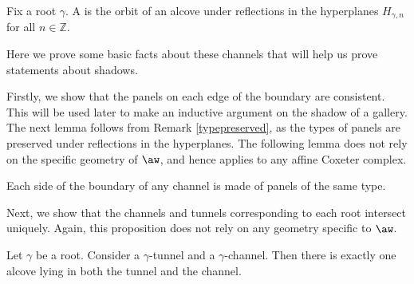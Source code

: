 \documentclass[11pt]{article}
\begin{document}
\begin{definition}
    Fix a root $\gamma$. A  is the orbit of an alcove under reflections in the hyperplanes $H_{\gamma,n}$ for all $n\in \mathbb{Z}$. 
\end{definition}


Here we prove some basic facts about these channels that will help us prove statements about shadows.

Firstly, we show that the panels on each edge of the boundary are consistent. This will be used later to make an inductive argument on the shadow of a gallery. The next lemma follows from Remark \ref{typepreserved}, as the types of panels are preserved under reflections in the hyperplanes. The following lemma does not rely on the specific geometry of $\aw$, and hence applies to any affine Coxeter complex. 
 

\begin{lemma} \label{boundary}
    Each side of the boundary of any channel is made of panels of the same type.
\end{lemma}


Next, we show that the channels and tunnels corresponding to each root intersect uniquely. Again, this proposition does not rely on any geometry specific to $\aw$.

\begin{proposition}\label{once}
    Let $\gamma$ be a root. Consider a $\gamma$-tunnel and a $\gamma$-channel. Then there is exactly one alcove lying in both the tunnel and the channel. 
\end{proposition}
\end{document}
